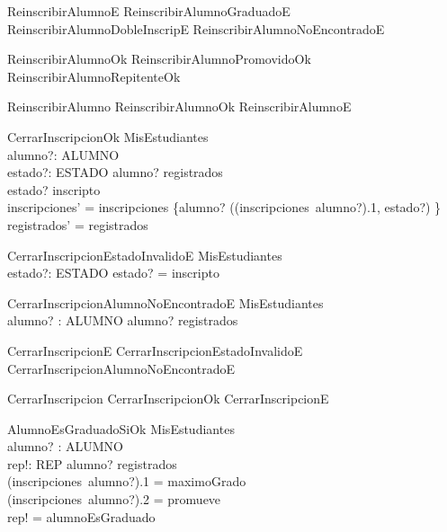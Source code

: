 \begin{zed}
    ReinscribirAlumnoE  ReinscribirAlumnoGraduadoE \lor ReinscribirAlumnoDobleInscripE \lor ReinscribirAlumnoNoEncontradoE
\end{zed}
\begin{zed}
    ReinscribirAlumnoOk  ReinscribirAlumnoPromovidoOk \lor ReinscribirAlumnoRepitenteOk
\end{zed}
\begin{zed}
    ReinscribirAlumno  ReinscribirAlumnoOk \lor ReinscribirAlumnoE
\end{zed}

\begin{schema}{CerrarInscripcionOk}
    \Delta MisEstudiantes \\
    alumno?: ALUMNO \\
    estado?: ESTADO
    \where
    alumno? \in registrados \\
    estado? \neq inscripto \\
    inscripciones' = inscripciones \oplus \{alumno? \mapsto ((inscripciones~alumno?).1, estado?) \} \\
    registrados' = registrados
\end{schema}

\begin{schema}{CerrarInscripcionEstadoInvalidoE}
    \Xi MisEstudiantes \\
    estado?: ESTADO
    \where
    estado? = inscripto
\end{schema}

\begin{schema}{CerrarInscripcionAlumnoNoEncontradoE}
    \Xi MisEstudiantes \\
    alumno? : ALUMNO
    \where
    alumno? \notin registrados
\end{schema}

\begin{zed}
    CerrarInscripcionE  CerrarInscripcionEstadoInvalidoE \lor CerrarInscripcionAlumnoNoEncontradoE
\end{zed}
\begin{zed}
    CerrarInscripcion  CerrarInscripcionOk \lor CerrarInscripcionE
\end{zed}

\begin{schema}{AlumnoEsGraduadoSiOk}
    \Xi MisEstudiantes \\
    alumno? : ALUMNO \\
    rep!: REP
    \where
    alumno? \in registrados \\
    (inscripciones~alumno?).1 = maximoGrado \\
    (inscripciones~alumno?).2 = promueve \\
    rep! = alumnoEsGraduado
\end{schema}


